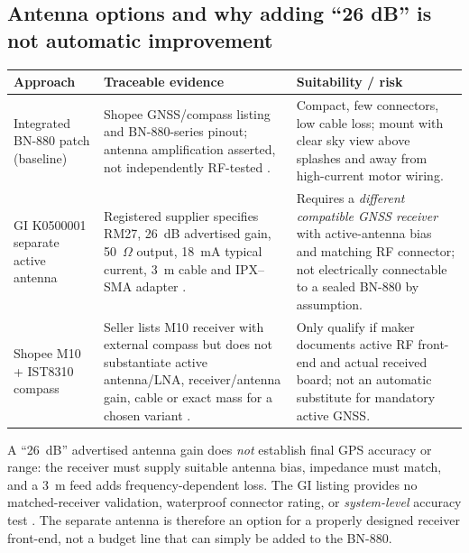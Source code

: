 \subsection{Antenna options and why adding ``26 dB'' is not automatic improvement}
\begin{tabularx}{\linewidth}{L{32mm}L{39mm}Y}
\toprule Approach & Traceable evidence & Suitability / risk \\\midrule
Integrated BN-880 patch (baseline) & Shopee GNSS/compass listing and BN-880-series pinout; antenna amplification asserted, not independently RF-tested \cite{bnShop,bnData,bn880Series}. & Compact, few connectors, low cable loss; mount with clear sky view above splashes and away from high-current motor wiring.\\
GI K0500001 separate active antenna & Registered supplier specifies RM27, 26~dB advertised gain, 50~$\Omega$ output, 18~mA typical current, 3~m cable and IPX--SMA adapter \cite{activeShop}. & Requires a \emph{different compatible GNSS receiver} with active-antenna bias and matching RF connector; not electrically connectable to a sealed BN-880 by assumption.\\
Shopee M10 + IST8310 compass & Seller lists M10 receiver with external compass but does not substantiate active antenna/LNA, receiver/antenna gain, cable or exact mass for a chosen variant \cite{m10Shop}. & Only qualify if maker documents active RF front-end and actual received board; not an automatic substitute for mandatory active GNSS.\\
\bottomrule
\end{tabularx}

A ``26~dB'' advertised antenna gain does \emph{not} establish final GPS accuracy or range: the receiver must supply suitable antenna bias, impedance must match, and a 3~m feed adds frequency-dependent loss. The GI listing provides no matched-receiver validation, waterproof connector rating, or \emph{system-level} accuracy test \cite{activeShop}. The separate antenna is therefore an option for a properly designed receiver front-end, not a budget line that can simply be added to the BN-880.

